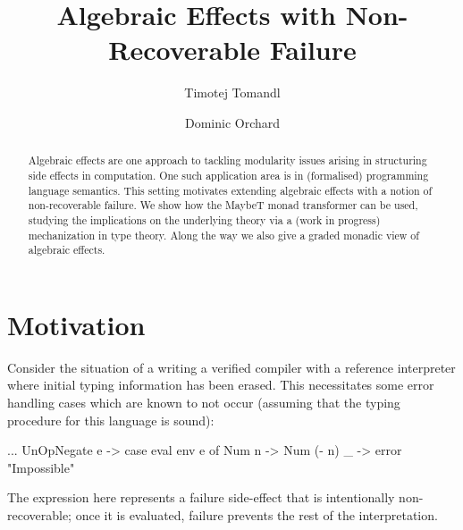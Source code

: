 \documentclass[preprint,sigplan]{acmart}
\title{Algebraic Effects with Non-Recoverable Failure}
\author{Timotej Tomandl}
\affiliation{
  \institution{University of Kent} %
}
\author{Dominic Orchard}
\affiliation{
  \institution{University of Kent} %
}
\begin{document}
\pagestyle{plain} %

\begin{abstract}
Algebraic effects are one approach to tackling modularity issues
arising in structuring side effects in computation.
One such application area is in (formalised) programming language
semantics. This setting motivates extending algebraic effects
with a notion of non-recoverable failure.
We show how the MaybeT monad transformer can be used, studying the
implications on the underlying theory via a (work in progress)
mechanization in type
theory. Along the way we also give a graded monadic view of algebraic
effects.
\end{abstract}

\maketitle
\vspace{-1em}

%
\section{Motivation}

Consider the situation of a writing a verified compiler with a
reference interpreter where initial typing information has been
erased. This necessitates some error handling cases which are known
to not occur (assuming that the typing procedure for this language is sound):
%
\begin{haskell}
... UnOpNegate e -> case eval env e of
                      Num n -> Num (- n)
                      _     -> error "Impossible"
\end{haskell}
%
The  expression here represents
a failure side-effect that is intentionally non-recoverable; once it
is evaluated, failure prevents the rest of the interpretation.
\end{document}
